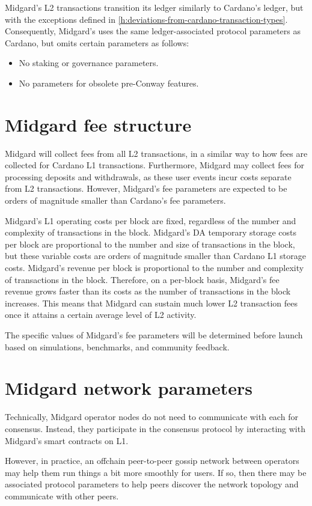\documentclass[../midgard.tex]{subfiles}
\begin{document}
Midgard's L2 transactions transition its ledger similarly to Cardano's ledger, but with the exceptions defined in \cref{h:deviations-from-cardano-transaction-types}.
Consequently, Midgard's uses the same ledger-associated protocol parameters as Cardano, but omits certain parameters as follows:
\begin{itemize}
  \item No staking or governance parameters.
  \item No parameters for obsolete pre-Conway features.
\end{itemize}

\section{Midgard fee structure}
\label{h:midgard-fee-structure}

Midgard will collect fees from all L2 transactions, in a similar way to how fees are collected for Cardano L1 transactions.
Furthermore, Midgard may collect fees for processing deposits and withdrawals, as these user events incur costs separate from L2 transactions.
However, Midgard's fee parameters are expected to be orders of magnitude smaller than Cardano's fee parameters.

Midgard's L1 operating costs per block are fixed, regardless of the number and complexity of transactions in the block.
Midgard's DA temporary storage costs per block are proportional to the number and size of transactions in the block, but these variable costs are orders of magnitude smaller than Cardano L1 storage costs.
Midgard's revenue per block is proportional to the number and complexity of transactions in the block.
Therefore, on a per-block basis, Midgard's fee revenue grows faster than its costs as the number of transactions in the block increases.
This means that Midgard can sustain much lower L2 transaction fees once it attains a certain average level of L2 activity.

The specific values of Midgard's fee parameters will be determined before launch based on simulations, benchmarks, and community feedback.

\section{Midgard network parameters}
\label{h:midgard-network-parameters}

Technically, Midgard operator nodes do not need to communicate with each for consensus.
Instead, they participate in the consensus protocol by interacting with Midgard's smart contracts on L1.

However, in practice, an offchain peer-to-peer gossip network between operators may help them run things a bit more smoothly for users.
If so, then there may be associated protocol parameters to help peers discover the network topology and communicate with other peers.
\end{document}
